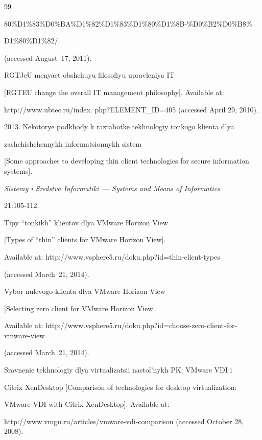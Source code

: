 {{\begin{thebibliography}{99}
{80\%D1\%83\%D0\%BA\%D1\%82\%D1\%83\%D1\%80\%D1\%8B-\%D0\%B2\%D0\%B8\%

D1\%80\%D1\%82/} 

(accessed August~17, 2011).


RGTJeU menyaet obshchuyu filosofiyu upravleniya IT 

[RGTEU change the overall IT management philosophy]. Available at: 

{\sf http://www.ubtec.ru/index. php?ELEMENT\_ID=405} (accessed April 29, 2010).



2013. Nekotorye podkhody k razrabotke tekhnologiy tonkogo klienta dlya 

zashchishchennykh informatsionnykh sistem 

[Some approaches to developing thin client technologies for secure information systems].

\textit{Sistemy i Sredstva Informatiki}~--- \textit{Systems and Means of Informatics} 

21:105-112. 


Tipy ``tonkikh'' klientov dlya VMware Horizon View 

[Types of ``thin'' clients for VMware Horizon View]. 

Available at: {\sf http://www.vsphere5.ru/doku.php?id=thin-client-types}

(accessed March~21, 2014).


Vybor nulevogo klienta dlya VMware Horizon View 

[Selecting zero client for VMware Horizon View]. 

Available at: {\sf http://www.vsphere5.ru/doku.php?id=choose-zero-client-for-vmware-view}

(accessed March~21, 2014).


Sravnenie tekhnologiy dlya virtualizatsii nastol'nykh PK: VMware VDI i 

Citrix XenDesktop [Comparison of technologies for desktop virtualization: 

VMware VDI with Citrix XenDesktop]. Available at: 

{\sf http://www.vmgu.ru/articles/vmware-vdi-comparison} (accessed October 28, 2008).


\end{thebibliography}}}

